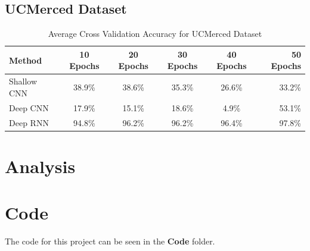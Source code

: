 \documentclass[12pt]{article}
\begin{document}
	\subsection{UCMerced Dataset}
	\begin{table}[h!]
		\begin{center}
			\caption{Average Cross Validation Accuracy for UCMerced Dataset}
			\label{table:ucm}
			\begin{tabular}{l | S | S | S | S |  r}
				\textbf{Method} & \textbf{10 Epochs} & \textbf{20 Epochs} & \textbf{30 Epochs} & \textbf{40 Epochs} & \textbf{50 Epochs} \\
				\hline
				Shallow CNN & 38.9\% & 38.6\% & 35.3\% & 26.6\% & 33.2\% \\
				Deep CNN & 17.9\% & 15.1\% & 18.6\% & 4.9\% & 53.1\% \\
				Deep RNN & 94.8\% & 96.2\% & 96.2\% & 96.4\% & 97.8\% \\
				
			
			\end{tabular}					
		
		
		\end{center}
	
	\end{table}
	
	\section{Analysis}
	
	\section{Code}
	
	The code for this project can be seen in the \textbf{Code} folder. 
	
	
	\newpage
	 
	
\end{document}
